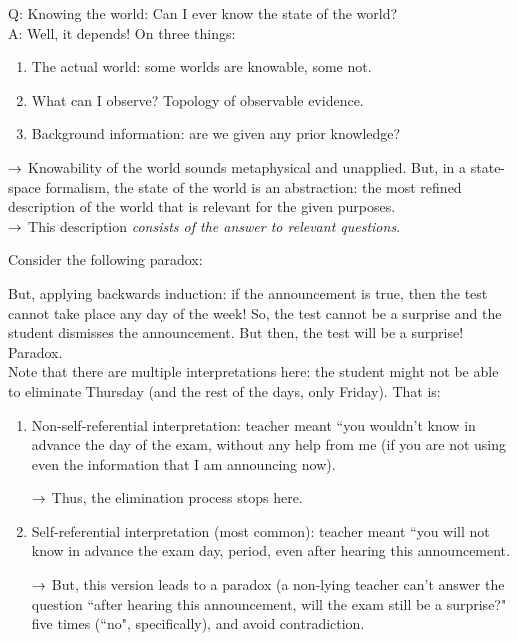 Q: Knowing the world: Can I ever know the state of the world? \\

A: Well, it depends! On three things:
\begin{enumerate}
    \item The actual world: some worlds are knowable, some not.
    \item What can I observe? Topology of observable evidence.
    \item Background information: are we given any prior knowledge?
\end{enumerate}

$\rightarrow$ Knowability of the world sounds metaphysical and unapplied. But, in a state-space formalism, the state of the world is an abstraction: the most refined description of the world that is relevant for the given purposes. \\

$\rightarrow$ This description {\it consists of the answer to relevant questions}. \\


Consider the following paradox:


But, applying backwards induction: if the announcement is true, then the test cannot take place any day of the week! So, the test cannot be a surprise and the student dismisses the announcement. But then, the test will be a surprise! Paradox. \\

Note that there are multiple interpretations here: the student might not be able to eliminate Thursday (and the rest of the days, only Friday). That is:
\begin{enumerate}
    \item Non-self-referential interpretation: teacher meant ``you wouldn't know in advance the day of the exam, without any help from me (if you are not using even the information that I am announcing now).
    
    $\rightarrow$ Thus, the elimination process stops here.
    
    \item Self-referential interpretation (most common): teacher meant ``you will not know in advance the exam day, period, even after hearing this announcement.
    
    $\rightarrow$ But, this version leads to a paradox (a non-lying teacher can't answer the question ``after hearing this announcement, will the exam still be a surprise?" five times (``no", specifically), and avoid contradiction.
\end{enumerate}


